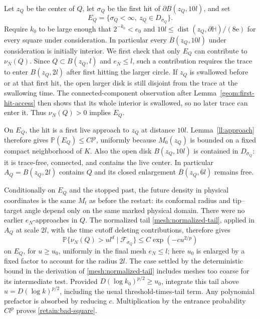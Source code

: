 Let $z_Q$ be the center of $Q$, let $\sigma_Q$ be the first hit of
$\partial B(z_Q,10l)$, and set
\[
 E_Q=\{\sigma_Q<\infty,\ z_Q\in D_{\sigma_Q}\}.
\]
Require $k_0$ to be large enough that $2^{-k_0}<e_0$ and
$10l\le\operatorname{dist}(z_Q,\partial\mathbb H)/(8\mathrm e)$
for every square under consideration.  In particular every
$\overline B(z_Q,10l)$ under consideration is initially interior.
We first check that only $E_Q$ can contribute to $\nu_N(Q)$.
Since $Q\subset B(z_Q,l)$ and $e_N\le l$, such a contribution requires
the trace to enter $B(z_Q,2l)$ after first hitting the larger circle.
If $z_Q$ is swallowed before or at that first hit, the open larger
disk is still disjoint from the trace at the swallowing time.  The
connected-component observation after Lemma~\ref{geom:first-hit-access}
then shows that its whole interior is swallowed, so no later trace
can enter it.
Thus $\nu_N(Q)>0$ implies $E_Q$.

On $E_Q$, the hit is a first live approach to $z_Q$ at distance $10l$.
Lemma~\ref{ll:approach} therefore gives
$\mathbb P(E_Q)\le Cl^p$, uniformly because $M_0(z_Q)$ is bounded on
a fixed compact neighborhood of $K$.  Also the open disk
$B(z_Q,10l)$ is contained in $D_{\sigma_Q}$: it is trace-free,
connected, and contains the live center.  In particular
$A_Q=B(z_Q,2l)$ contains $Q$ and its closed enlargement
$\overline B(z_Q,6l)$ remains free.

Conditionally on $E_Q$ and the stopped past, the future density in
physical coordinates is the same $M_t$ as before the restart: its
conformal radius and tip--target angle depend only on the same marked
physical domain.  There were no earlier $e_N$-approaches in
$Q$.  The normalized tail \eqref{mesh:normalized-tail}, applied in
$A_Q$ at scale $2l$, with the time cutoff deleting contributions,
therefore gives
\[
 \mathbb P\{\nu_N(Q)>u l^d\mid\mathcal F_{\sigma_Q}\}
 \le C\exp(-cu^{2/p})
\]
on $E_Q$, for $u\ge u_0$, uniformly in the final mesh $e_N\le l$;
here $u_0$ is enlarged by a fixed factor to account for the radius $2l$.
The case settled by the deterministic bound in the derivation of
\eqref{mesh:normalized-tail} includes meshes too coarse for its
intermediate test.  Provided $D(\log k_0)^{p/2}\ge u_0$, integrate
this tail above
$u=D(\log k)^{p/2}$, including the usual threshold-times-tail term.
Any polynomial prefactor is absorbed by reducing $c$.  Multiplication
by the entrance probability $Cl^p$ proves
\eqref{retain:bad-square}.


